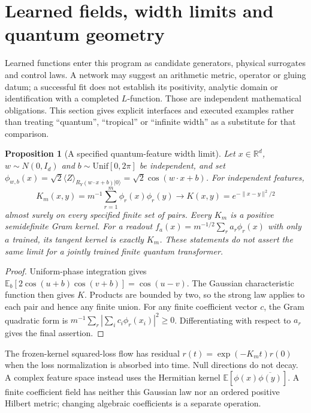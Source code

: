 \documentclass[11pt,oneside,openany]{book}
\newtheorem{proposition}[theorem]{Proposition}
\theoremstyle{definition}\newtheorem{definition}[theorem]{Definition}
\theoremstyle{remark}\newtheorem{remark}[theorem]{Remark}
\begin{document}
\section{Learned fields, width limits and quantum geometry}\label{lf:core}
Learned functions enter this program as candidate generators, physical
surrogates and control laws. A network may suggest an arithmetic metric,
operator or gluing datum; a successful fit does not establish its positivity,
analytic domain or identification with a completed $L$-function. Those are
independent mathematical obligations. This section gives explicit interfaces
and executed examples rather than treating ``quantum'', ``tropical'' or
``infinite width'' as a substitute for that comparison.

\begin{proposition}[A specified quantum-feature width limit]\label{lf:kernel}
Let $x\in\mathbb R^d$, $w\sim N(0,I_d)$ and
$b\sim\mathrm{Unif}[0,2\pi]$ be independent, and set
$\phi_{w,b}(x)=\sqrt2\langle Z\rangle_{R_Y(w\cdot x+b)|0\rangle}
=\sqrt2\cos(w\cdot x+b)$. For independent features,
\[
 K_m(x,y)=m^{-1}\sum_{r=1}^m\phi_r(x)\phi_r(y)
 \longrightarrow K(x,y)=e^{-\|x-y\|^2/2}
\]
almost surely on every specified finite set of pairs. Every $K_m$ is a
positive semidefinite Gram kernel. For a readout
$f_a(x)=m^{-1/2}\sum_r a_r\phi_r(x)$ with only $a$ trained, its tangent
kernel is exactly $K_m$. These statements do not assert the same limit
for a jointly trained finite quantum transformer.
\end{proposition}
\begin{proof}
Uniform-phase integration gives
$\mathbb E_b[2\cos(u+b)\cos(v+b)]=\cos(u-v)$.
The Gaussian characteristic function then gives $K$. Products are bounded
by two, so the strong law applies to each pair and hence any finite union.
For any finite coefficient vector $c$, the Gram quadratic form is
$m^{-1}\sum_r|\sum_i c_i\phi_r(x_i)|^2\geq0$.
Differentiating with respect to $a_r$ gives the final assertion.
\end{proof}
The frozen-kernel squared-loss flow has residual
$r(t)=\exp(-K_m t)r(0)$ when the loss normalization is absorbed into time.
Null directions do not decay. A complex feature space instead uses the
Hermitian kernel $\mathbb E[\phi(x)\overline{\phi(y)}]$.
A finite coefficient field has neither this Gaussian law nor an ordered
positive Hilbert metric; changing algebraic coefficients is a separate operation.
\end{document}
